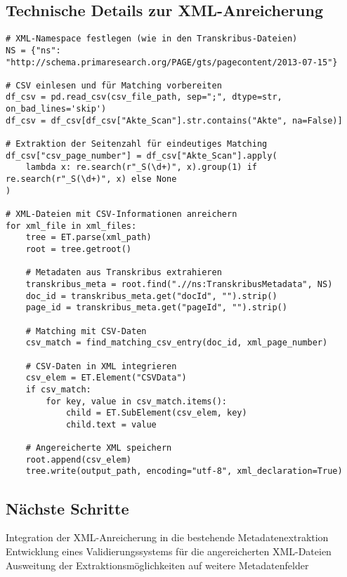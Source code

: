 \documentclass{article}
\begin{document}
\subsection*{Technische Details zur XML-Anreicherung}
\begin{verbatim}
# XML-Namespace festlegen (wie in den Transkribus-Dateien)
NS = {"ns": "http://schema.primaresearch.org/PAGE/gts/pagecontent/2013-07-15"}

# CSV einlesen und für Matching vorbereiten
df_csv = pd.read_csv(csv_file_path, sep=";", dtype=str, on_bad_lines='skip')
df_csv = df_csv[df_csv["Akte_Scan"].str.contains("Akte", na=False)]

# Extraktion der Seitenzahl für eindeutiges Matching
df_csv["csv_page_number"] = df_csv["Akte_Scan"].apply(
    lambda x: re.search(r"_S(\d+)", x).group(1) if re.search(r"_S(\d+)", x) else None
)

# XML-Dateien mit CSV-Informationen anreichern
for xml_file in xml_files:
    tree = ET.parse(xml_path)
    root = tree.getroot()
    
    # Metadaten aus Transkribus extrahieren
    transkribus_meta = root.find(".//ns:TranskribusMetadata", NS)
    doc_id = transkribus_meta.get("docId", "").strip()
    page_id = transkribus_meta.get("pageId", "").strip()
    
    # Matching mit CSV-Daten
    csv_match = find_matching_csv_entry(doc_id, xml_page_number)
    
    # CSV-Daten in XML integrieren
    csv_elem = ET.Element("CSVData")
    if csv_match:
        for key, value in csv_match.items():
            child = ET.SubElement(csv_elem, key)
            child.text = value
    
    # Angereicherte XML speichern
    root.append(csv_elem)
    tree.write(output_path, encoding="utf-8", xml_declaration=True)
\end{verbatim}

\subsection*{Nächste Schritte}
 Integration der XML-Anreicherung in die bestehende Metadatenextraktion\\
 Entwicklung eines Validierungssystems für die angereicherten XML-Dateien\\
 Ausweitung der Extraktionsmöglichkeiten auf weitere Metadatenfelder

\noindent\hrulefill
\end{document}
